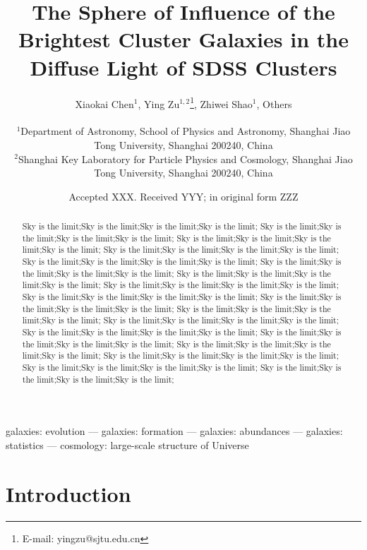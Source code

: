 \documentclass[fleqn,usenatbib]{mnras}
\title[Decomposition of the Diffuse Cluster Light]{The Sphere of
Influence of the Brightest Cluster Galaxies in the Diffuse Light of SDSS
Clusters}
\author[Chen 2021]
{Xiaokai Chen$^{1}$,
Ying  Zu$^{1, 2}$\thanks{E-mail: yingzu@sjtu.edu.cn},
Zhiwei Shao$^{1}$,
Others
\\ \\
$^{1}$Department of Astronomy, School of Physics and Astronomy, Shanghai Jiao Tong
University, Shanghai 200240, China\\
$^{2}$Shanghai Key Laboratory for Particle Physics and Cosmology, Shanghai Jiao Tong
University, Shanghai 200240, China\\
}
\date{Accepted XXX. Received YYY; in original form ZZZ}
\begin{document}
\label{firstpage}
\pagerange{\pageref{firstpage}--\pageref{lastpage}}
\maketitle

\begin{abstract}
    Sky is the limit;Sky is the limit;Sky is the limit;Sky is the limit;
    Sky is the limit;Sky is the limit;Sky is the limit;Sky is the limit;
    Sky is the limit;Sky is the limit;Sky is the limit;Sky is the limit;
    Sky is the limit;Sky is the limit;Sky is the limit;Sky is the limit;
    Sky is the limit;Sky is the limit;Sky is the limit;Sky is the limit;
    Sky is the limit;Sky is the limit;Sky is the limit;Sky is the limit;
    Sky is the limit;Sky is the limit;Sky is the limit;Sky is the limit;
    Sky is the limit;Sky is the limit;Sky is the limit;Sky is the limit;
    Sky is the limit;Sky is the limit;Sky is the limit;Sky is the limit;
    Sky is the limit;Sky is the limit;Sky is the limit;Sky is the limit;
    Sky is the limit;Sky is the limit;Sky is the limit;Sky is the limit;
    Sky is the limit;Sky is the limit;Sky is the limit;Sky is the limit;
    Sky is the limit;Sky is the limit;Sky is the limit;Sky is the limit;
    Sky is the limit;Sky is the limit;Sky is the limit;Sky is the limit;
    Sky is the limit;Sky is the limit;Sky is the limit;Sky is the limit;
    Sky is the limit;Sky is the limit;Sky is the limit;Sky is the limit;
    Sky is the limit;Sky is the limit;Sky is the limit;Sky is the limit;
    Sky is the limit;Sky is the limit;Sky is the limit;Sky is the limit;
\end{abstract}
\begin{keywords} galaxies: evolution --- galaxies: formation --- galaxies: abundances ---
galaxies: statistics --- cosmology: large-scale structure of Universe \end{keywords}




\vspace{1in}

\section{Introduction}
\label{sec:intro}
\end{document}
